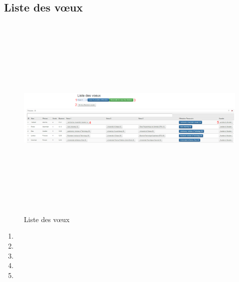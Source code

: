    \subsection{Liste des vœux}
   \label{lv}
   \begin{figure}[H]
   	\centering
   	\includegraphics[width=18cm,height=10cm]{Images/Admin/liste_voeux_admin.png}
   	\caption{Liste des vœux} 	
   \end{figure}
   \begin{enumerate}
   	\item
   	\item
   	\item
   	\item
   	\item
	\end{enumerate}
   
